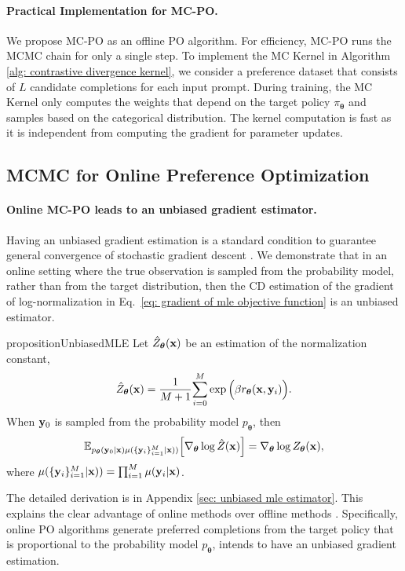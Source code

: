 \paragraph{Practical Implementation for MC-PO.}
We propose MC-PO as an offline PO algorithm.
For efficiency,
MC-PO runs the MCMC chain for only a single step.
To implement the MC Kernel in Algorithm \ref{alg: contrastive divergence kernel},
we consider a preference dataset that consists of $L$ candidate completions for each input prompt.
During training,
the MC Kernel only computes the weights that depend on the target policy $\pi_{\boldsymbol\theta}$ and samples based on the categorical distribution.
The kernel computation is fast as it is independent from computing the gradient for parameter updates.




\subsection{MCMC for Online Preference Optimization}
\label{sec: omcmc preference optimization}
\paragraph{Online MC-PO leads to an unbiased gradient estimator.}
Having an unbiased gradient estimation is a standard condition to guarantee general convergence of stochastic gradient descent \citep{bottou2018optimization}.
We demonstrate that in an online setting where the true observation is sampled from the probability model, rather than from the target distribution, 
then the CD estimation of the gradient of log-normalization in Eq.~\eqref{eq: gradient of mle objective function} is an unbiased estimator.
\begin{restatable}{proposition}{UnbiasedMLE}
\label{prop: unbiased mle estimator}
Let 
$\hat{Z}_{\boldsymbol\theta}(\mathbf{x})$
be an estimation of the normalization constant,
\begin{equation*}
\hat{Z}_{\boldsymbol\theta}(\mathbf{x})
=
\frac{1}{M + 1}
{\sum_{i=0}^M \exp
\Big(
\beta
r_{\boldsymbol\theta}(\mathbf{x}, \mathbf{y}_i)
\Big)}.
\end{equation*}
When $\mathbf{y}_0$ is sampled from the probability model $p_{\boldsymbol\theta}$,
then
\begin{equation*}
\mathbb{E}_{p_{\boldsymbol\theta}(\mathbf{y}_0 | \mathbf{x}) 
\mu(\{\mathbf{y}_i\}_{i=1}^M | \mathbf{x}))
}
\Big[
\nabla_{\boldsymbol\theta}
\log
\hat{Z}(\mathbf{x})
\Big]
=
\nabla_{\boldsymbol\theta} \log Z_{\boldsymbol\theta}(\mathbf{x}),
\end{equation*}
where $\mu(\{\mathbf{y}_i\}_{i=1}^M | \mathbf{x})) = \prod_{i=1}^M \mu(\mathbf{y}_i | \mathbf{x})$.
\end{restatable}
The detailed derivation is in Appendix \ref{sec: unbiased mle estimator}.
This explains the clear advantage of online methods over offline methods \citep{tang2024understanding}.
Specifically,
online PO algorithms generate preferred completions from the target policy that is proportional to the probability model $p_{\boldsymbol\theta}$,
intends to have an unbiased gradient estimation.

